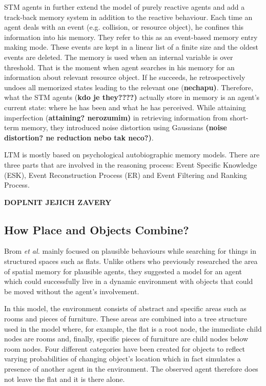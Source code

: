 STM agents in further extend the model of purely reactive agents and add a track-back memory system in addition to the reactive behaviour. Each time an agent deals with an event (e.g. collision, or resource object), he confines this information into his memory. They refer to this as an event-based memory entry making mode. These events are kept in a linear list of a finite size and the oldest events are deleted. The memory is used when an internal variable is over threshold. That is the moment when agent searches in his memory for an information about relevant resource object. If he succeeds, he retrospectively undoes all memorized states leading to the relevant one (\textbf{nechapu)}. Therefore, what the STM agents (\textbf{kdo je they????)} actually store in memory is an agent’s current state: where he has been and what he has perceived. While attaining imperfection (\textbf{attaining? nerozumim)} in retrieving information from short-term memory, they introduced noise distortion using Gaussians \textbf{(noise distortion? ne reduction nebo tak neco?)}.

LTM is mostly based on psychological autobiographic memory models. There are three parts that are involved in the reasoning process: Event Specific Knowledge (ESK), Event Reconstruction Process (ER) and Event Filtering and Ranking Process.

\textbf{DOPLNIT JEJICH ZAVERY}

\subsection{How Place and Objects Combine?}
\label{subsec:howplaceandobjectscombine}

Brom \textit{et al.} mainly focused on plausible behaviours while searching for things in structured spaces such as flats.\cite{Brom:placeandobjects} Unlike others who previously researched the area of spatial memory for plausible agents, they suggested a model for an agent which could successfully live in a dynamic environment with objects that could be moved without the agent’s involvement. 

In this model, the environment consists of abstract and specific areas such as rooms and pieces of furniture. These areas are combined into a tree structure used in the model where, for example, the flat is a root node, the immediate child nodes are rooms and, finally, specific pieces of furniture are child nodes below room nodes. Four different categories have been created for objects to reflect varying probabilities of changing object’s location which in fact simulates a presence of another agent in the environment. The observed agent therefore does not leave the flat and it is there alone.

